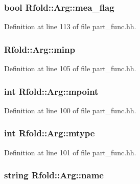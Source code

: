 \hypertarget{class_rfold_1_1_arg_a7b3d1a355bec84586c9832c1858a2f6b}{
\subsubsection[{mea\+\_\+flag}]{\setlength{\rightskip}{0pt plus 5cm}bool Rfold\+::\+Arg\+::mea\+\_\+flag}}\label{class_rfold_1_1_arg_a7b3d1a355bec84586c9832c1858a2f6b}


Definition at line 113 of file part\+\_\+func.\+hh.

\hypertarget{class_rfold_1_1_arg_a4ea3681597506bb5d8b10e2cda9a3ca6}{
\subsubsection[{minp}]{ Rfold\+::\+Arg\+::minp}}\label{class_rfold_1_1_arg_a4ea3681597506bb5d8b10e2cda9a3ca6}


Definition at line 105 of file part\+\_\+func.\+hh.

\hypertarget{class_rfold_1_1_arg_a273269902f8a9b9974c1d46800df16e9}{
\subsubsection[{mpoint}]{\setlength{\rightskip}{0pt plus 5cm}int Rfold\+::\+Arg\+::mpoint}}\label{class_rfold_1_1_arg_a273269902f8a9b9974c1d46800df16e9}


Definition at line 100 of file part\+\_\+func.\+hh.

\hypertarget{class_rfold_1_1_arg_a9736867f9aac222c47efa0b5218fc8fa}{
\subsubsection[{mtype}]{\setlength{\rightskip}{0pt plus 5cm}int Rfold\+::\+Arg\+::mtype}}\label{class_rfold_1_1_arg_a9736867f9aac222c47efa0b5218fc8fa}


Definition at line 101 of file part\+\_\+func.\+hh.

\hypertarget{class_rfold_1_1_arg_a38ab74cced49339e67fe8f70bb6827fb}{
\subsubsection[{name}]{\setlength{\rightskip}{0pt plus 5cm}string Rfold\+::\+Arg\+::name}}\label{class_rfold_1_1_arg_a38ab74cced49339e67fe8f70bb6827fb}


